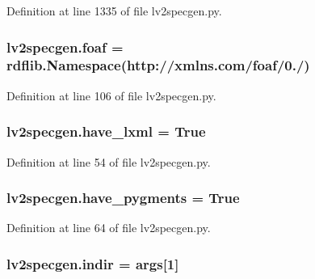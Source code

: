 Definition at line 1335 of file lv2specgen.\+py.

\subsubsection[{\texorpdfstring{foaf}{foaf}}]{\setlength{\rightskip}{0pt plus 5cm}lv2specgen.\+foaf = rdflib.\+Namespace(\textquotesingle{}http\+://xmlns.\+com/foaf/0./\textquotesingle{})}\hypertarget{namespacelv2specgen_a1b9c82d5c0db55e05beed3a7d86eca84}{}\label{namespacelv2specgen_a1b9c82d5c0db55e05beed3a7d86eca84}


Definition at line 106 of file lv2specgen.\+py.

\subsubsection[{\texorpdfstring{have\+\_\+lxml}{have_lxml}}]{ lv2specgen.\+have\+\_\+lxml = True}\hypertarget{namespacelv2specgen_a5f186d4600535a3109fe6977f26df75a}{}\label{namespacelv2specgen_a5f186d4600535a3109fe6977f26df75a}


Definition at line 54 of file lv2specgen.\+py.

\subsubsection[{\texorpdfstring{have\+\_\+pygments}{have_pygments}}]{ lv2specgen.\+have\+\_\+pygments = True}\hypertarget{namespacelv2specgen_a24e036b9e06280d1ebb5c8f358c535b0}{}\label{namespacelv2specgen_a24e036b9e06280d1ebb5c8f358c535b0}


Definition at line 64 of file lv2specgen.\+py.

\subsubsection[{\texorpdfstring{indir}{indir}}]{\setlength{\rightskip}{0pt plus 5cm}lv2specgen.\+indir = {\bf args}\mbox{[}1\mbox{]}}\hypertarget{namespacelv2specgen_afced2c0f6d1b740f15b5645236267468}{}\label{namespacelv2specgen_afced2c0f6d1b740f15b5645236267468}


